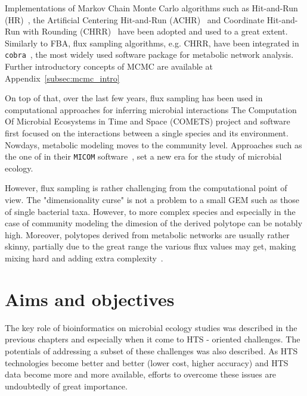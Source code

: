      Implementations of Markov Chain Monte Carlo algorithms such as 
      Hit-and-Run (HR)~\cite{smith84},  
      the Artificial Centering Hit-and-Run
      (ACHR)~\cite{kaufman1998direction} 
      and Coordinate Hit-and-Run with Rounding
      (CHRR)~\cite{haraldsdottir2017chrr}
      have been adopted and used to a great extent. 
      Similarly to FBA, flux sampling algorithms, e.g. CHRR, have been integrated in \texttt{cobra}~\cite{heirendt2019creation},
      the most widely used 
      software package for metabolic network analysis.
      Further introductory concepts of MCMC are available at Appendix~\ref{subsec:mcmc_intro}

      On top of that, over the last few years, flux sampling has been 
      used in computational approaches for inferring microbial interactions 
      The Computation Of Microbial Ecosystems in Time and Space (COMETS) project and software~\cite{dukovski2021metabolic}
      first focused on the interactions between a single species and its environment. 
      Nowdays, metabolic modeling moves to the community level. 
      Approaches such as the one of \citeauthor{diener2020micom} in their \texttt{MICOM}
      software~\cite{diener2020micom}, set a new era for the study of microbial ecology. 
      
      
      However, flux sampling is rather challenging from the computational point of view. 
      The "dimensionality curse" is not a problem to a small GEM such as those of single bacterial taxa.
      However, to more complex species and especially in the case of community modeling 
      the dimesion of the derived polytope can be notably high. 
      Moreover, polytopes derived from metabolic networks are usually rather skinny,
      partially due to the great range the various flux values may get, 
      making mixing hard and 
      adding extra complexity~\cite{Haraldsdottir17,schellenberger2009use}. 


      
\section{Aims and objectives}

   The key role of bioinformatics on microbial ecology studies
   was described in the previous chapters and especially 
   when it come to HTS - oriented challenges. 
   The potentials of addressing a subset of these challenges was also 
   described. 
   As HTS technologies become better and better 
   (lower cost, higher accuracy)
   and HTS data become more and more available, 
   efforts to overcome these issues 
   are undoubtedly of great importance. 


